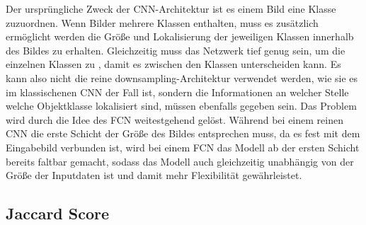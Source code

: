 Der ursprüngliche Zweck der \ac{CNN}-Architektur ist es einem Bild eine Klasse zuzuordnen.
Wenn Bilder mehrere Klassen enthalten, muss es zusätzlich ermöglicht werden die Größe und Lokalisierung der jeweiligen
Klassen innerhalb des Bildes zu erhalten.
Gleichzeitig muss das Netzwerk tief genug sein, um die einzelnen Klassen zu \grqq, damit es zwischen den
Klassen unterscheiden kann.
Es kann also nicht die reine downsampling-Architektur verwendet werden, wie sie es im klassischenen \ac{CNN} der Fall ist,
sondern die Informationen an welcher Stelle welche Objektklasse lokalisiert sind, müssen ebenfalls gegeben sein.
Das Problem wird durch die Idee des \ac{FCN} weitestgehend gelöst.
Während bei einem reinen \ac{CNN} die erste Schicht der Größe des Bildes entsprechen muss, da es fest mit dem
Eingabebild verbunden ist, wird bei einem \ac{FCN} das Modell ab der ersten Schicht bereits faltbar gemacht, sodass das
Modell auch gleichzeitig unabhängig von der Größe der Inputdaten ist und damit mehr Flexibilität gewährleistet.

\subsection{Jaccard Score}
